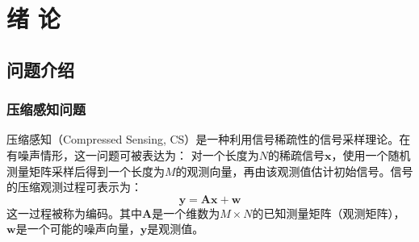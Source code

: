 \documentclass[AutoFakeBold]{LZUThesis}
\begin{document}
\tableofcontents




\mainmatter

\chapter{\texorpdfstring{绪 \quad 论}{绪论}}



\section{问题介绍}

\subsection{压缩感知问题}

压缩感知（Compressed Sensing, CS）\cite{1614066}是一种利用信号稀疏性的信号采样理论。在有噪声情形，这一问题可被表达为：
对一个长度为$N$的稀疏信号$\mathbf{x}$，使用一个随机测量矩阵采样后得到一个长度为$M$的观测向量，再由该观测值估计初始信号。信号的压缩观测过程可表示为：
\begin{equation}
    \mathbf{y} = \mathbf{Ax} + \mathbf{w}
\end{equation}
这一过程被称为编码。其中$\mathbf{A}$是一个维数为$M \times N$的已知测量矩阵（观测矩阵），$\mathbf{w}$是一个可能的噪声向量，$\mathbf{y}$是观测值。
\end{document}
